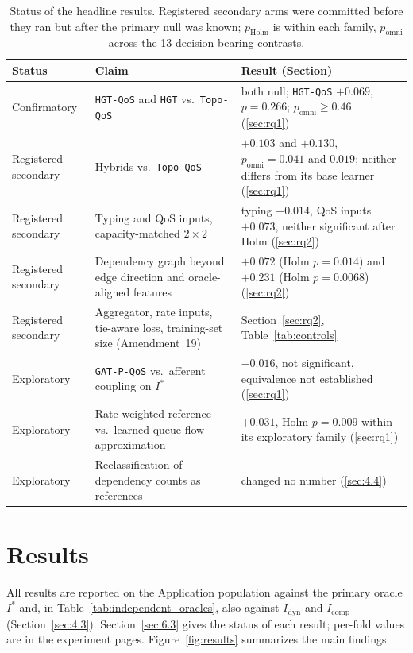 \documentclass[preprint,3p]{elsarticle}
\begin{document}
\begin{table}[htbp]
\centering
\footnotesize
\caption{Status of the headline results. Registered secondary arms were committed before they ran but after the primary null was known; $p_{\text{Holm}}$ is within each family, $p_{\text{omni}}$ across the 13 decision-bearing contrasts.}
\label{tab:claims}
\setlength{\tabcolsep}{3pt}
\begin{tabular}{@{}p{2.3cm}p{5.4cm}p{6.2cm}@{}}
\toprule
\textbf{Status} & \textbf{Claim} & \textbf{Result (Section)} \\
\midrule
Confirmatory & \texttt{HGT-QoS} and \texttt{HGT} vs.\ \texttt{Topo-QoS} & both null; \texttt{HGT-QoS} $+0.069$, $p = 0.266$; $p_{\text{omni}} \ge 0.46$ (\ref{sec:rq1}) \\
Registered secondary & Hybrids vs.\ \texttt{Topo-QoS} & $+0.103$ and $+0.130$, $p_{\text{omni}} = 0.041$ and $0.019$; neither differs from its base learner (\ref{sec:rq1}) \\
Registered secondary & Typing and QoS inputs, capacity-matched $2\times2$ & typing $-0.014$, QoS inputs $+0.073$, neither significant after Holm (\ref{sec:rq2}) \\
Registered secondary & Dependency graph beyond edge direction and oracle-aligned features & $+0.072$ (Holm $p = 0.014$) and $+0.231$ (Holm $p = 0.0068$) (\ref{sec:rq2}) \\
Registered secondary & Aggregator, rate inputs, tie-aware loss, training-set size (Amendment~19) & Section~\ref{sec:rq2}, Table~\ref{tab:controls} \\
Exploratory & \texttt{GAT-P-QoS} vs.\ afferent coupling on $I^*$ & $-0.016$, not significant, equivalence not established (\ref{sec:rq1}) \\
Exploratory & Rate-weighted reference vs.\ learned queue-flow approximation & $+0.031$, Holm $p = 0.009$ within its exploratory family (\ref{sec:rq1}) \\
Exploratory & Reclassification of dependency counts as references & changed no number (\ref{sec:4.4}) \\
\bottomrule
\end{tabular}
\end{table}

\section{Results}
\label{sec:7}

All results are reported on the Application population against the primary oracle $I^*$ and, in Table~\ref{tab:independent_oracles}, also against $I_{\text{dyn}}$ and $I_{\text{comp}}$ (Section~\ref{sec:4.3}). Section~\ref{sec:6.3} gives the status of each result; per-fold values are in the experiment pages. Figure~\ref{fig:results} summarizes the main findings.
\end{document}
